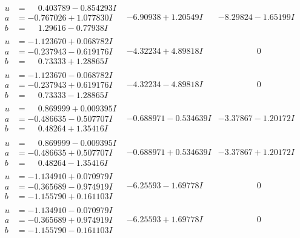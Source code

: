 \documentclass[1p]{elsarticle_modified}
\theoremstyle{definition}
\begin{document}
$$\begin{array}{c|c|c}
\begin{aligned}
u &= \phantom{-}0.403789 - 0.854293 I \\
a &= -0.767026 + 1.077830 I \\
b &= \phantom{-}1.29616 - 0.77938 I\end{aligned}
 & -6.90938 + 1.20549 I & -8.29824 - 1.65199 I \\ \hline\begin{aligned}
u &= -1.123670 + 0.068782 I \\
a &= -0.237943 - 0.619176 I \\
b &= \phantom{-}0.73333 + 1.28865 I\end{aligned}
 & -4.32234 + 4.89818 I & \phantom{-0.000000 } 0 \\ \hline\begin{aligned}
u &= -1.123670 - 0.068782 I \\
a &= -0.237943 + 0.619176 I \\
b &= \phantom{-}0.73333 - 1.28865 I\end{aligned}
 & -4.32234 - 4.89818 I & \phantom{-0.000000 } 0 \\ \hline\begin{aligned}
u &= \phantom{-}0.869999 + 0.009395 I \\
a &= -0.486635 - 0.507707 I \\
b &= \phantom{-}0.48264 + 1.35416 I\end{aligned}
 & -0.688971 - 0.534639 I & -3.37867 - 1.20172 I \\ \hline\begin{aligned}
u &= \phantom{-}0.869999 - 0.009395 I \\
a &= -0.486635 + 0.507707 I \\
b &= \phantom{-}0.48264 - 1.35416 I\end{aligned}
 & -0.688971 + 0.534639 I & -3.37867 + 1.20172 I \\ \hline\begin{aligned}
u &= -1.134910 + 0.070979 I \\
a &= -0.365689 - 0.974919 I \\
b &= -1.155790 + 0.161103 I\end{aligned}
 & -6.25593 - 1.69778 I & \phantom{-0.000000 } 0 \\ \hline\begin{aligned}
u &= -1.134910 - 0.070979 I \\
a &= -0.365689 + 0.974919 I \\
b &= -1.155790 - 0.161103 I\end{aligned}
 & -6.25593 + 1.69778 I & \phantom{-0.000000 } 0 \\ \hline\begin{aligned}

\end{aligned}
\end{array}$$
\end{document}
